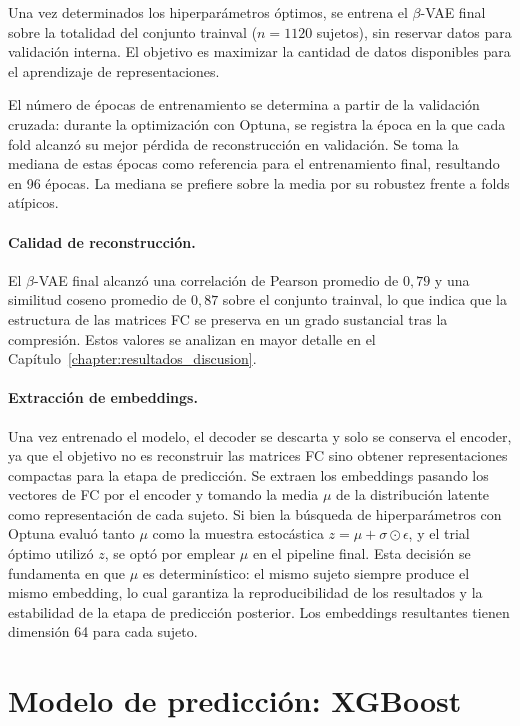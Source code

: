 Una vez determinados los hiperparámetros óptimos, se entrena el $\beta$-VAE final sobre la totalidad del conjunto trainval ($n = 1120$ sujetos), sin reservar datos para validación interna. El objetivo es maximizar la cantidad de datos disponibles para el aprendizaje de representaciones.

El número de épocas de entrenamiento se determina a partir de la validación cruzada: durante la optimización con Optuna, se registra la época en la que cada fold alcanzó su mejor pérdida de reconstrucción en validación. Se toma la mediana de estas épocas como referencia para el entrenamiento final, resultando en 96 épocas. La mediana se prefiere sobre la media por su robustez frente a folds atípicos.

\paragraph{Calidad de reconstrucción.} El $\beta$-VAE final alcanzó una correlación de Pearson promedio de $0{,}79$ y una similitud coseno promedio de $0{,}87$ sobre el conjunto trainval, lo que indica que la estructura de las matrices FC se preserva en un grado sustancial tras la compresión. Estos valores se analizan en mayor detalle en el Capítulo~\ref{chapter:resultados_discusion}.

\paragraph{Extracción de embeddings.} Una vez entrenado el modelo, el decoder se descarta y solo se conserva el encoder, ya que el objetivo no es reconstruir las matrices FC sino obtener representaciones compactas para la etapa de predicción. Se extraen los embeddings pasando los vectores de FC por el encoder y tomando la media $\mu$ de la distribución latente como representación de cada sujeto. Si bien la búsqueda de hiperparámetros con Optuna evaluó tanto $\mu$ como la muestra estocástica $z = \mu + \sigma \odot \epsilon$, y el trial óptimo utilizó $z$, se optó por emplear $\mu$ en el pipeline final. Esta decisión se fundamenta en que $\mu$ es determinístico: el mismo sujeto siempre produce el mismo embedding, lo cual garantiza la reproducibilidad de los resultados y la estabilidad de la etapa de predicción posterior. Los embeddings resultantes tienen dimensión 64 para cada sujeto.

\section{Modelo de predicción: XGBoost}
\label{sec:xgboost_pipeline}

